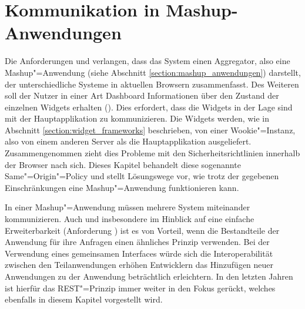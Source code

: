 \section{Kommunikation in Mashup-Anwendungen}\label{section:kommunikation_in_mashup_anwendungen}
Die Anforderungen  und  verlangen, dass das System einen Aggregator, also eine Mashup"=Anwendung (siehe Abschnitt \ref{section:mashup_anwendungen}) darstellt, der unterschiedliche Systeme in aktuellen Browsern zusammenfasst. Des Weiteren soll der Nutzer in einer Art Dashboard Informationen über den Zustand der einzelnen Widgets erhalten (). Dies erfordert, dass die Widgets in der Lage sind mit der Hauptapplikation zu kommunizieren. Die Widgets werden, wie in Abschnitt \ref{section:widget_frameworks} beschrieben, von einer Wookie"=Instanz, also von einem anderen Server als die Hauptapplikation ausgeliefert. Zusammengenommen zieht dies Probleme mit den Sicherheitsrichtlinien innerhalb der Browser nach sich. Dieses Kapitel behandelt diese sogenannte Same"=Origin"=Policy und stellt Lösungswege vor, wie trotz der gegebenen Einschränkungen eine Mashup"=Anwendung funktionieren kann.

In einer Mashup"=Anwendung müssen mehrere System miteinander kommunizieren. Auch und insbesondere im Hinblick auf eine einfache Erweiterbarkeit (Anforderung ) ist es von Vorteil, wenn die Bestandteile der Anwendung für ihre Anfragen einen ähnliches Prinzip verwenden. Bei der Verwendung eines gemeinsamen Interfaces würde sich die Interoperabilität zwischen den Teilanwendungen erhöhen Entwicklern das Hinzufügen neuer Anwendungen zu der Anwendung beträchtlich erleichtern. In den letzten Jahren ist hierfür das REST"=Prinzip immer weiter in den Fokus gerückt, welches ebenfalls in diesem Kapitel vorgestellt wird.

